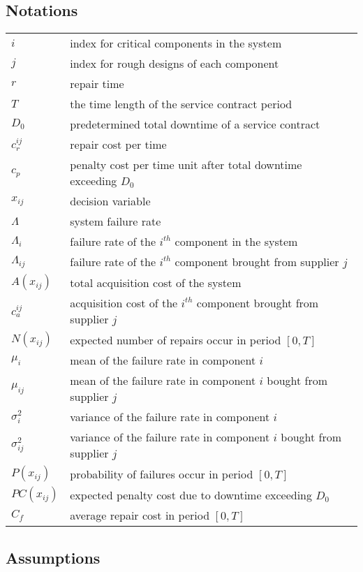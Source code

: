 \documentclass[preprint,12pt]{elsarticle}
\begin{document}
 \subsection{Notations}
   \begin{tabular}{l l}
$i$ & index for critical components in the system\\
$j$ & index for rough designs of each component\\
$r$ & repair time\\
$T$ & the time length of the service contract period\\
$D_0$ & predetermined total downtime of a service contract\\
$c_r^{ij}$ & repair cost per time\\
$c_p$ & penalty cost per time unit after total downtime exceeding $D_0$ \\
$x_{ij}$ & decision variable\\
$\Lambda$    & system failure rate\\
$\Lambda_{i}$  & failure rate of the $i^{th}$ component in the system \\
$\Lambda_{ij}$ & failure rate of the $i^{th}$ component brought from supplier $j$ \\
$A(x_{ij})$  & total acquisition cost of the system\\
$c^{ij}_{a}$ & acquisition cost of the $i^{th}$ component brought from supplier $j$\\
$N(x_{ij})$ & expected number of repairs occur in period $[0, T]$\\
$\mu_{i}$ & mean of the failure rate in component $i$ \\
$\mu_{ij}$ & mean of the failure rate in component $i$ bought from supplier $j$ \\
$\sigma_{i}^{2}$ &  variance of the failure rate in component $i$ \\
$\sigma_{ij}^{2}$ & variance of the failure rate in component $i$ bought from supplier $j$ \\
$P(x_{ij})$  & probability of   failures occur in period $[0, T]$ \\
$PC(x_{ij})$ & expected penalty cost due to downtime exceeding $D_{0}$ \\
$C_f$    & average repair cost in period $[0, T]$

	\end{tabular}
	 \subsection{Assumptions}
	
\end{document}
